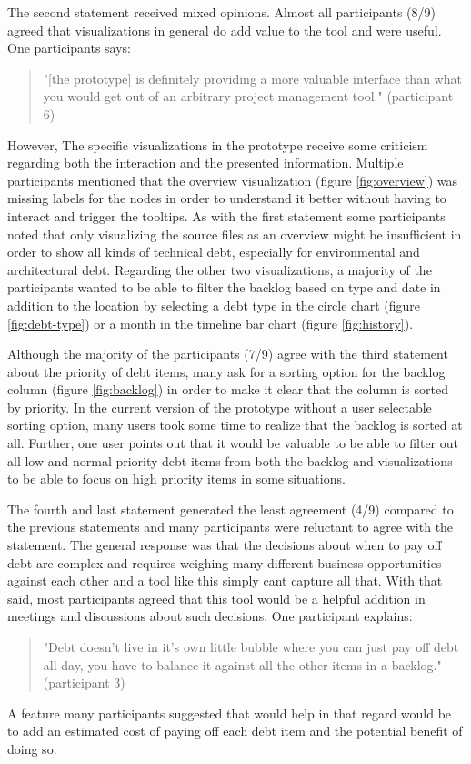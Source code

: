 The second statement received mixed opinions.
Almost all participants (8/9) agreed that visualizations in general do add value to the tool and were useful.
One participants says:
\begin{quote}
  "[the prototype] is definitely providing a more valuable interface than what you would get out of an arbitrary project management tool." (participant 6)
\end{quote}
However, The specific visualizations in the prototype receive some criticism regarding both the interaction and the presented information. 
Multiple participants mentioned that the overview visualization (figure \ref{fig:overview}) was missing labels for the nodes in order to understand it better without having to interact and trigger the tooltips.
As with the first statement some participants noted that only visualizing the source files as an overview might be insufficient in order to show all kinds of technical debt, especially for environmental and architectural debt.
Regarding the other two visualizations, a majority of the participants wanted to be able to filter the backlog based on type and date in addition to the location by selecting a debt type in the circle chart (figure \ref{fig:debt-type}) or a month in the timeline bar chart (figure \ref{fig:history}).

Although the majority of the participants (7/9) agree with the third statement about the priority of debt items, many ask for a sorting option for the backlog column (figure \ref{fig:backlog}) in order to make it clear that the column is sorted by priority.
In the current version of the prototype without a user selectable sorting option, many users took some time to realize that the backlog is sorted at all.
Further, one user points out that it would be valuable to be able to filter out all low and normal priority debt items from both the backlog and visualizations to be able to focus on high priority items in some situations.

The fourth and last statement generated the least agreement (4/9) compared to the previous statements and many participants were reluctant to agree with the statement.
The general response was that the decisions about when to pay off debt are complex and requires weighing many different business opportunities against each other and a tool like this simply cant capture all that.
With that said, most participants agreed that this tool would be a helpful addition in meetings and discussions about such decisions.
One participant explains:
\begin{quote}
  "Debt doesn't live in it's own little bubble where you can just pay off debt all day, you have to balance it against all the other items in a backlog." (participant 3)
\end{quote}
A feature many participants suggested that would help in that regard would be to add an estimated cost of paying off each debt item and the potential benefit of doing so.

